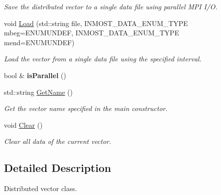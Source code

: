 \begin{DoxyCompactItemize}
\begin{DoxyCompactList}\small\item\em Save the distributed vector to a single data file using parallel M\-P\-I I/\-O. \end{DoxyCompactList}\item 
void \hyperlink{classINMOST_1_1Solver_1_1Vector_ab7f65abafaecaf6041cbef420a855492}{Load} (std\-::string file, I\-N\-M\-O\-S\-T\-\_\-\-D\-A\-T\-A\-\_\-\-E\-N\-U\-M\-\_\-\-T\-Y\-P\-E mbeg=E\-N\-U\-M\-U\-N\-D\-E\-F, I\-N\-M\-O\-S\-T\-\_\-\-D\-A\-T\-A\-\_\-\-E\-N\-U\-M\-\_\-\-T\-Y\-P\-E mend=E\-N\-U\-M\-U\-N\-D\-E\-F)
\begin{DoxyCompactList}\small\item\em Load the vector from a single data file using the specified interval. \end{DoxyCompactList}\item 
\hypertarget{classINMOST_1_1Solver_1_1Vector_a8fa8d5925f1399eaedb9d01389bdf0eb}{bool \& {\bfseries is\-Parallel} ()}\label{classINMOST_1_1Solver_1_1Vector_a8fa8d5925f1399eaedb9d01389bdf0eb}

\item 
\hypertarget{classINMOST_1_1Solver_1_1Vector_adc67da372d4e0c4fb0e989b8887b19aa}{std\-::string \hyperlink{classINMOST_1_1Solver_1_1Vector_adc67da372d4e0c4fb0e989b8887b19aa}{Get\-Name} ()}\label{classINMOST_1_1Solver_1_1Vector_adc67da372d4e0c4fb0e989b8887b19aa}

\begin{DoxyCompactList}\small\item\em Get the vector name specified in the main constructor. \end{DoxyCompactList}\item 
\hypertarget{classINMOST_1_1Solver_1_1Vector_a8ed3f06e77d644902890a65bf994ae08}{void \hyperlink{classINMOST_1_1Solver_1_1Vector_a8ed3f06e77d644902890a65bf994ae08}{Clear} ()}\label{classINMOST_1_1Solver_1_1Vector_a8ed3f06e77d644902890a65bf994ae08}

\begin{DoxyCompactList}\small\item\em Clear all data of the current vector. \end{DoxyCompactList}\end{DoxyCompactItemize}


\subsection{Detailed Description}
Distributed vector class. 

